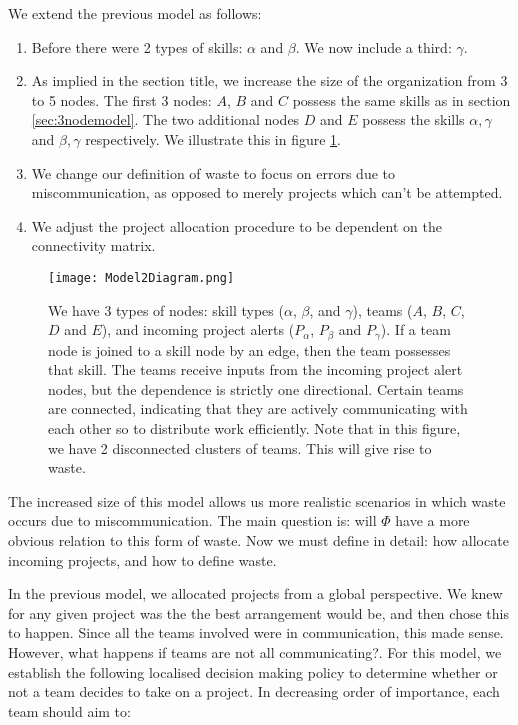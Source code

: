 We extend the previous model as follows: 
\begin{enumerate}


	\item Before there were 2 types of skills: $\alpha$ and $\beta$. We now include a third: $\gamma$.
	
	\item As implied in the section title, we increase the size of the organization from 3 to 5 nodes. The first 3 nodes: $A$, $B$ and $C$ possess the same skills as in section \ref{sec:3nodemodel}. The two additional nodes $D$ and $E$ possess the skills $\alpha, \gamma$ and $\beta, \gamma$ respectively. We illustrate this in figure \ref{fig:diagram2}.
	
	\item We change our definition of waste to focus on errors due to miscommunication, as opposed to merely projects which can't be attempted.
	
	\item We adjust the project allocation procedure to be dependent on the connectivity matrix.
\end{enumerate}

\begin{figure}[ht]
	\centering	
	\texttt{[image: Model2Diagram.png]}
	\caption{We have 3 types of nodes: skill types ($\alpha$, $\beta$, and $\gamma$), teams ($A$, $B$, $C$, $D$ and $E$), and incoming project alerts ($P_\alpha$, $P_\beta$ and $P_\gamma$). If a team node is joined to a skill node by an edge, then the team possesses that skill. The teams receive inputs from the incoming project alert nodes, but the dependence is strictly one directional.
		Certain teams are connected, indicating that they are actively communicating with each other so to distribute work efficiently. Note that in this figure, we have 2 disconnected clusters of teams. This will give rise to waste.}
	\label{fig:diagram2}
\end{figure}

The increased size of this model allows us more realistic scenarios in which waste occurs due to miscommunication. The main question is: will $\Phi$ have a more obvious relation to this form of waste. Now we must define in detail: how allocate incoming projects, and how to define waste.


In the previous model, we allocated projects from a global perspective. We knew for any given project was the the best arrangement would be, and then chose this to happen. Since all the teams involved were in communication, this made sense. However, what happens if teams are not all communicating?. For this model, we establish the following localised decision making policy to determine whether or not a team decides to take on a project. In decreasing order of importance, each team should aim to:


